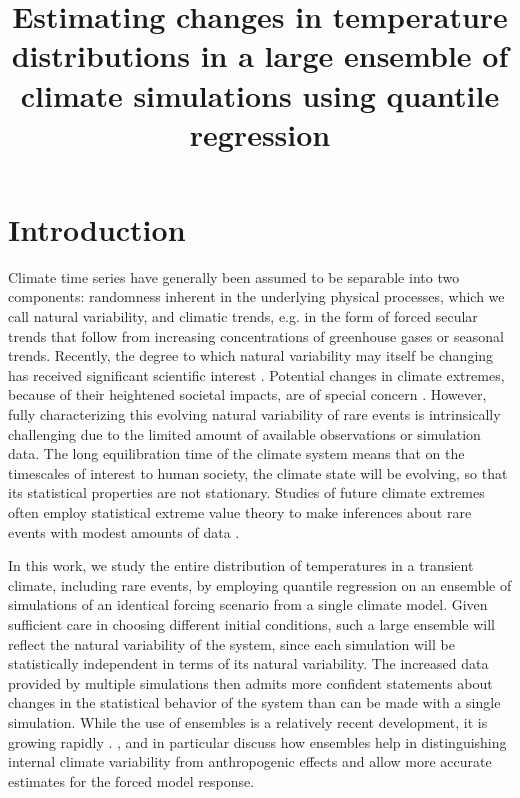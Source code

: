 \documentclass{ametsoc}
\title{Estimating changes in temperature distributions in a large ensemble of climate simulations using quantile regression}
\affiliation{University of Chicago, Chicago, USA}
\begin{document}
	
\maketitle

\section{Introduction}

Climate time series have generally been assumed to be separable into two components: randomness inherent in the underlying physical processes, which we call natural variability, and climatic trends, e.g. in the form of forced secular trends that follow from increasing concentrations of greenhouse gases or seasonal trends.
Recently, the degree to which natural variability may itself be changing has received significant scientific interest \citep[e.g.][]{trenberth2011attribution, donat2012shifting,deser2012communication, thompson2015quantifying, kay2015community}. Potential changes in climate extremes, because of their heightened societal impacts, are of special concern \citep[e.g.][]{davison1990models, stott2004human, chavez2005generalized, eastoe2009modelling, otto2012reconciling, swain2014extraordinary, singh2014severe, trenberth2015attribution, diffenbaugh2015anthropogenic, huang2015changes, jalbert2017spatiotemporal}. 
However, fully characterizing this evolving natural variability of rare events is intrinsically challenging due to the limited amount of available observations or simulation data.
The long equilibration time of the climate system means that on the timescales of interest to human society, the climate state will be evolving, so that its statistical properties are not stationary. Studies of future climate extremes often employ statistical extreme value theory to make inferences about rare events with modest amounts of data \citep{swain2014extraordinary}.

In this work, we study the entire distribution of temperatures in a transient climate, including rare events, by employing quantile regression on an ensemble of simulations of an identical forcing scenario from a single climate model. Given sufficient care in choosing different initial conditions, such a large ensemble will reflect the natural variability of the system, since each simulation will be statistically independent in terms of its natural variability. 
The increased data provided by multiple simulations then admits more confident statements about changes in the statistical behavior of the system than can be made with a single simulation. While the use of ensembles is a relatively recent development, it is growing rapidly \citep[e.g.][]{deser2012uncertainty, deser2012communication,deser2014projecting,fischer2014detection, kay2015community,sriver2015effects, rodgers2015emergence, hagos2016projection}. \citet{deser2012uncertainty}, \citet{deser2012communication} and \citet{fischer2014detection} in particular discuss how ensembles help in distinguishing internal climate variability from anthropogenic effects and allow more accurate estimates for the forced model response.
\end{document}
